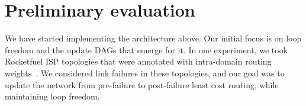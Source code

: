 


\section{Preliminary evaluation}
\label{sec:eval}

We have started implementing the architecture above. Our initial focus is on loop freedom and the update DAGs that emerge for it. In one experiment, we took Rocketfuel ISP topologies that were annotated with intra-domain routing weights~\cite{rocketfuel}. We considered link failures in these topologies, and our goal was to update the network from pre-failure to post-failure least cost routing, while maintaining loop freedom. 

